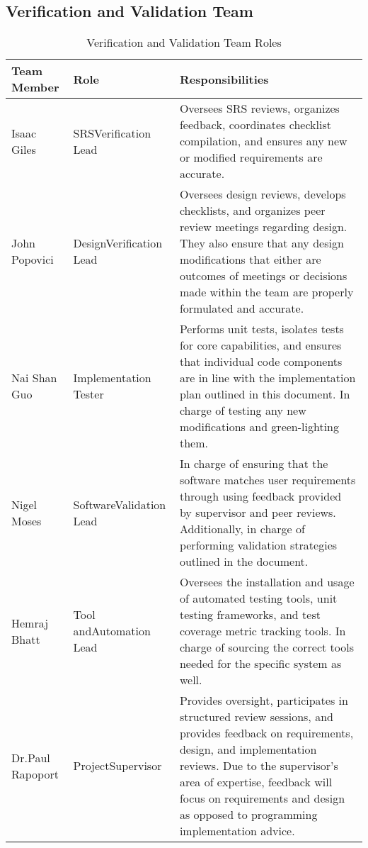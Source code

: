 \documentclass[12pt, titlepage]{article}
\begin{document}
\subsection{Verification and Validation Team}
\begin{table}[H]
  \centering
  \begin{adjustbox}{max width=0.80\textwidth} 
    \begin{tabularx}{\linewidth}{|p{2.5cm}|p{2.75cm}|X|} 
    \hline
    \textbf{Team Member} & \textbf{Role} & \textbf{Responsibilities} \\ \hline
    Isaac Giles & SRS\newline Verification Lead & Oversees SRS reviews, organizes feedback, coordinates checklist compilation, and ensures any new or modified requirements are accurate. \\ \hline
    John Popovici & Design\newline Verification Lead & Oversees design reviews, develops checklists, and organizes peer review meetings regarding design. They also ensure that any design modifications that either are outcomes of meetings or decisions made within the team are properly formulated and accurate.  \\ \hline
    Nai Shan Guo & Implementation Tester & Performs unit tests, isolates tests for core capabilities, and ensures that individual code components are in line with the implementation plan outlined in this document. In charge of testing any new modifications and green-lighting them. \\ \hline
    Nigel Moses & Software\newline Validation Lead & In charge of ensuring that the software matches user requirements through using feedback provided by supervisor and peer reviews. Additionally, in charge of performing validation strategies outlined in the document. \\ \hline
    Hemraj Bhatt & Tool and\newline Automation Lead & Oversees the installation and usage of automated testing tools, unit testing frameworks, and test coverage metric tracking tools. In charge of sourcing the correct tools needed for the specific system as well. \\ \hline
    Dr.\newline Paul Rapoport & Project\newline Supervisor & Provides oversight, participates in structured review sessions, and provides feedback on requirements, design, and implementation reviews. Due to the supervisor's area of expertise, feedback will focus on requirements and design as opposed to programming implementation advice. \\ \hline
    \end{tabularx}
  \end{adjustbox}
  \caption{Verification and Validation Team Roles}
  \label{tab:team}
\end{table}
\end{document}
